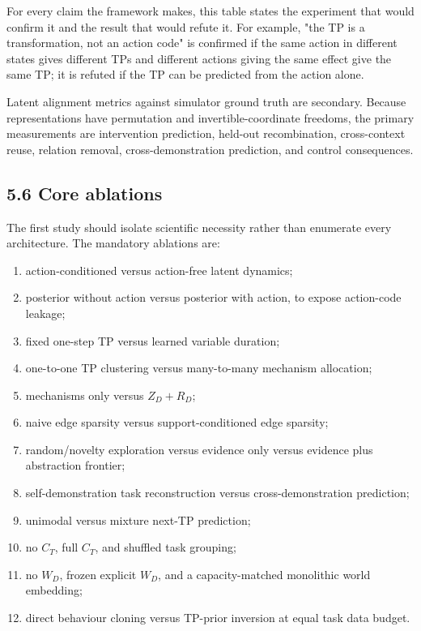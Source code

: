 \documentclass[11pt]{article}
\newenvironment{plainword}{%
  \par\medskip\noindent\begin{minipage}{\textwidth}%
  \color{gray!75!black}\small\itshape
}{%
  \end{minipage}\par\medskip}
\begin{document}
\begin{plainword}
For every claim the framework makes, this table states the experiment that would confirm it and the result that would refute it.
For example, "the TP is a transformation, not an action code" is confirmed if the same action in different states gives different TPs
and different actions giving the same effect give the same TP; it is refuted if the TP can be predicted from the action alone.
\end{plainword}

Latent alignment metrics against simulator ground truth are secondary. Because representations have permutation and
invertible-coordinate freedoms, the primary measurements are intervention prediction, held-out recombination, cross-context reuse,
relation removal, cross-demonstration prediction, and control consequences.

\subsection*{5.6 Core ablations}

The first study should isolate scientific necessity rather than enumerate every architecture. The mandatory ablations are:

\begin{enumerate}
\item action-conditioned versus action-free latent dynamics;
\item posterior without action versus posterior with action, to expose action-code leakage;
\item fixed one-step TP versus learned variable duration;
\item one-to-one TP clustering versus many-to-many mechanism allocation;
\item mechanisms only versus $Z_D+R_D$;
\item naive edge sparsity versus support-conditioned edge sparsity;
\item random/novelty exploration versus evidence only versus evidence plus abstraction frontier;
\item self-demonstration task reconstruction versus cross-demonstration prediction;
\item unimodal versus mixture next-TP prediction;
\item no $C_T$, full $C_T$, and shuffled task grouping;
\item no $W_D$, frozen explicit $W_D$, and a capacity-matched monolithic world embedding;
\item direct behaviour cloning versus TP-prior inversion at equal task data budget.
\end{enumerate}
\end{document}
